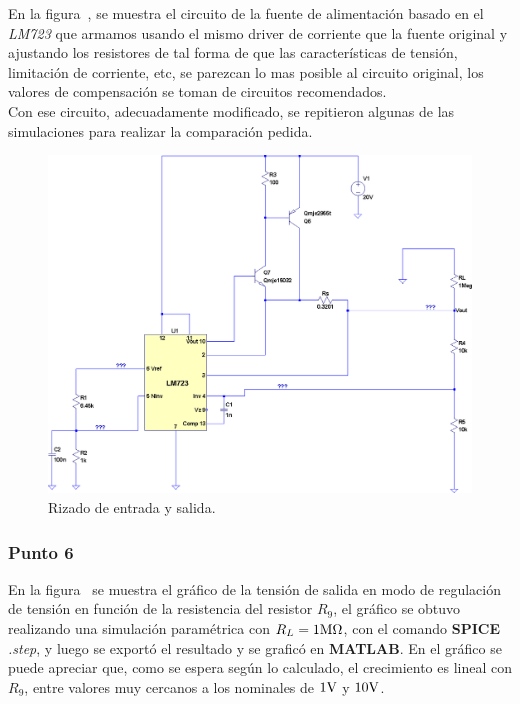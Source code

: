 \vspace{1.5cm}

En la figura~, se muestra el circuito de la fuente de alimentación basado en el \textit{LM723} que armamos usando el mismo driver de corriente que la fuente original y ajustando los resistores de tal forma de que las características de tensión, limitación de corriente, etc, se parezcan lo mas posible al circuito original, los valores de compensación se toman de circuitos recomendados.\\
Con ese circuito, adecuadamente modificado, se repitieron algunas de las simulaciones para realizar la comparación pedida.\\

\vfill


\clearpage

\begin{figure}[H] %
\begin{center}
\includegraphics[width=1.2 \textwidth, angle=90]{./img/preguntas/p21.png}
\caption{\label{fig:fig_p21}\footnotesize{Rizado de entrada y salida.}}
\end{center}
\end{figure}

\clearpage

\subsubsection{Punto 6}


En la figura~ se muestra el gráfico de la tensión de salida en modo de regulación de tensión en función de la resistencia del resistor $R_{9}$, el gráfico se obtuvo realizando una simulación paramétrica con $R_{L} = 1 \si[per-mode=symbol]{\mega\ohm}$, con el comando \textbf{SPICE} \textit{.step}, y luego se exportó el resultado y se graficó en \textbf{MATLAB}. En el gráfico se puede apreciar que, como se espera según lo calculado, el crecimiento es lineal con $R_{9}$, entre valores muy cercanos a los nominales de $1 \si[per-mode=symbol]{\volt}$ y $10 \si[per-mode=symbol]{\volt}$.





